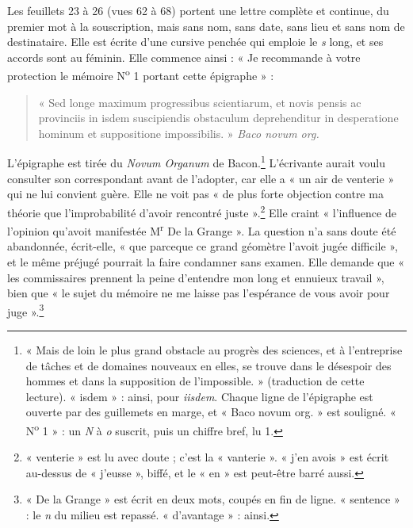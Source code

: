 \documentclass[11pt,a4paper]{article}
\begin{document}
Les feuillets 23 à 26 (vues 62 à 68) portent une lettre complète et continue,
du premier mot à la souscription, mais sans nom, sans date, sans lieu et sans
nom de destinataire. Elle est écrite d'une cursive penchée qui emploie le
\emph{s} long, et ses accords sont au féminin. Elle commence ainsi : « Je
recommande à votre protection le mémoire N\textsuperscript{o} 1 portant cette
épigraphe » :
\begin{quote}
« Sed longe maximum progressibus scientiarum, et novis pensis ac provinciis in
isdem suscipiendis obstaculum deprehenditur in desperatione hominum et
suppositione impossibilis. » \emph{Baco novum org.}
\end{quote}
L'épigraphe est tirée du \emph{Novum Organum} de Bacon.\footnote{« Mais de
loin le plus grand obstacle au progrès des sciences, et à l'entreprise de
tâches et de domaines nouveaux en elles, se trouve dans le désespoir des
hommes et dans la supposition de l'impossible. » (traduction de cette
lecture). « isdem » : ainsi, pour \emph{iisdem}. Chaque ligne de l'épigraphe
est ouverte par des guillemets en marge, et « Baco novum org. » est souligné.
« N\textsuperscript{o} 1 » : un \emph{N} à \emph{o} suscrit, puis un chiffre
bref, lu 1.} L'écrivante aurait voulu consulter son correspondant avant de
l'adopter, car elle a « un air de venterie » qui ne lui convient guère.
Elle ne voit pas « de plus forte objection contre ma théorie que
l'improbabilité d'avoir rencontré juste ».\footnote{« venterie » est lu avec
doute ; c'est la « vanterie ». « j'en avois » est écrit au-dessus de
« j'eusse », biffé, et le « en » est peut-être barré aussi.} Elle craint
« l'influence de l'opinion qu'avoit manifestée M\textsuperscript{r} De la
Grange ». La question n'a sans doute été abandonnée, écrit-elle, « que
parceque ce grand géomètre l'avoit jugée difficile », et le même préjugé
pourrait la faire condamner sans examen. Elle demande que « les commissaires
prennent la peine d'entendre mon long et ennuieux travail », bien que « le sujet
du mémoire ne me laisse pas l'espérance de vous avoir pour
juge ».\footnote{« De la Grange » est écrit en deux mots, coupés en fin de
ligne. « sentence » : le \emph{n} du milieu est repassé. « d'avantage » :
ainsi.}
\end{document}
